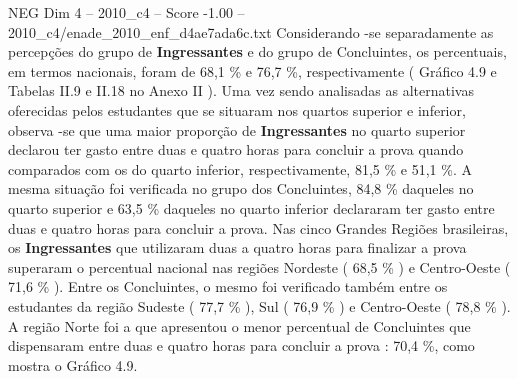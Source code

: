 \begin{textsample}{NEG Dim 4 – 2010\_c4 – Score -1.00 – 2010\_c4/enade\_2010\_enf\_d4ae7ada6c.txt}
Considerando -se separadamente as percepções do grupo de \textbf{Ingressantes} e do grupo de Concluintes, os percentuais, em termos nacionais, foram de 68,1 \% e 76,7 \%, respectivamente ( Gráfico 4.9 e Tabelas II.9 e II.18 no Anexo II ).
Uma vez sendo analisadas as alternativas oferecidas pelos estudantes que se situaram nos quartos superior e inferior, observa -se que uma maior proporção de \textbf{Ingressantes} no quarto superior declarou ter gasto entre duas e quatro horas para concluir a prova quando comparados com os do quarto inferior, respectivamente, 81,5 \% e 51,1 \%.
A mesma situação foi verificada no grupo dos Concluintes, 84,8 \% daqueles no quarto superior e 63,5 \% daqueles no quarto inferior declararam ter gasto entre duas e quatro horas para concluir a prova.
Nas cinco Grandes Regiões brasileiras, os \textbf{Ingressantes} que utilizaram duas a quatro horas para finalizar a prova superaram o percentual nacional nas regiões Nordeste ( 68,5 \% ) e Centro-Oeste ( 71,6 \% ).
Entre os Concluintes, o mesmo foi verificado também entre os estudantes da região Sudeste ( 77,7 \% ), Sul ( 76,9 \% ) e Centro-Oeste ( 78,8 \% ).
A região Norte foi a que apresentou o menor percentual de Concluintes que dispensaram entre duas e quatro horas para concluir a prova : 70,4 \%, como mostra o Gráfico 4.9.

\end{textsample}
